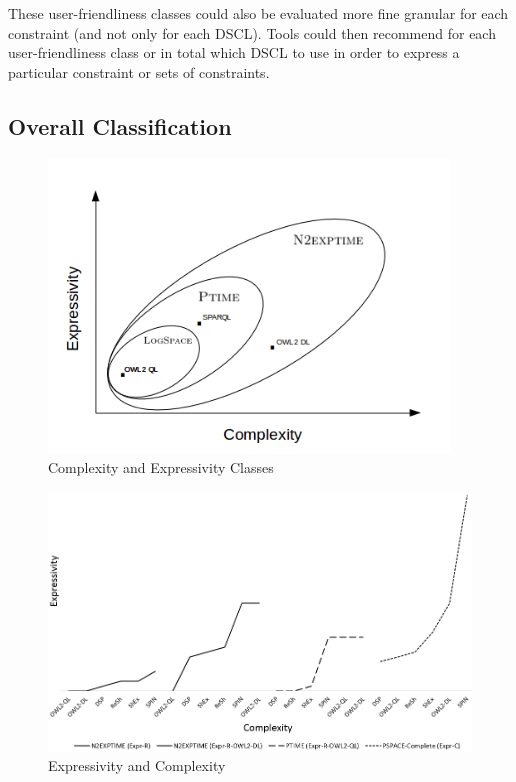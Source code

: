 \documentclass{llncs}
\begin{document}
These user-friendliness classes could also be evaluated more fine granular for each constraint (and not only for each DSCL).
Tools could then recommend for each user-friendliness class or in total which DSCL to use in order to express a particular constraint or sets of constraints. 

\subsection{Overall Classification}
 
\begin{figure}
	\centering
		\includegraphics[width=0.95\textwidth]{complexiity_and_expressivity.png}
	\caption{Complexity and Expressivity Classes}
	\label{fig:VennDiagram}
\end{figure}
  
\begin{figure}
	\centering
		\includegraphics[width=1.00\textwidth]{expressivity-complexity-3.png}
	\caption{Expressivity and Complexity}
	\label{fig:expressivity-complexity}
\end{figure}
\end{document}
